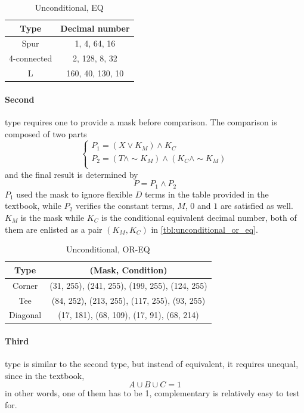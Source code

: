 \documentclass[12pt]{article}
\begin{document}
\begin{table}[H]
\caption{Unconditional, EQ}
	\centering
	\begin{tabular}{c|c}	
	Type & Decimal number \\
	\hline
	\hline
	Spur & 1, 4, 64, 16\\
	4-connected & 2, 128, 8, 32\\
	L & 160, 40, 130, 10
	\end{tabular}
	\label{tbl:unconditional_eq}
\end{table}

\paragraph{Second} type requires one to provide a mask before comparison.
The comparison is composed of two parts
\begin{equation}
\begin{cases}
	P_1 = (X \vee K_M) \wedge K_C \\
	P_2 = (T \wedge \sim K_M) \wedge (K_C \wedge \sim K_M)\\
\end{cases}
\label{eq:unconditional_or_eq_eq}
\end{equation}
and the final result is determined by 
\begin{equation}
	P = P_1 \wedge P_2
\end{equation}
$P_1$ used the mask to ignore flexible $D$ terms in the table provided in the textbook, while $P_2$ verifies the constant terms, $M$, $0$ and $1$ are satisfied as well.
$K_M$ is the mask while $K_C$ is the conditional equivalent decimal number, both of them are enlisted as a pair $(K_M, K_C)$ in \autoref{tbl:unconditional_or_eq}.

\begin{table}[H]
\caption{Unconditional, OR-EQ}
	\centering
	\begin{tabular}{c|c}	
	Type & (Mask, Condition) \\
	\hline
	\hline
	Corner & (31, 255), (241, 255), (199, 255), (124, 255) \\
	Tee & (84, 252), (213, 255), (117, 255), (93, 255) \\
	Diagonal & (17, 181), (68, 109), (17, 91), (68, 214)\\
	\end{tabular}
	\label{tbl:unconditional_or_eq}
\end{table}

\paragraph{Third} type is similar to the second type, but instead of equivalent, it requires unequal, since in the textbook, 
\begin{equation}
	A \cup B \cup C = 1
\end{equation}
in other words, one of them has to be 1, complementary is relatively easy to test for.
\end{document}
